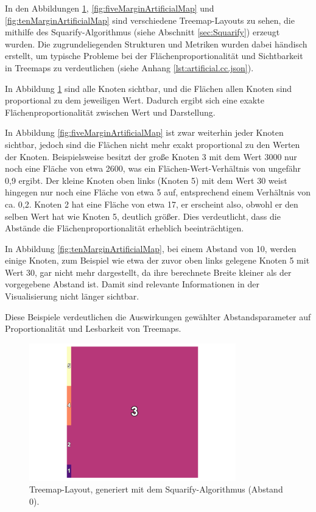 In den Abbildungen \ref{fig:zeroMarginArtificialMap}, \ref{fig:fiveMarginArtificialMap} und \ref{fig:tenMarginArtificialMap} sind verschiedene Treemap-Layouts zu sehen, die mithilfe des Squarify-Algorithmus (siehe Abschnitt \ref{sec:Squarify}) erzeugt wurden. Die zugrundeliegenden Strukturen und Metriken wurden dabei händisch erstellt, um typische Probleme bei der Flächenproportionalität und Sichtbarkeit in Treemaps zu verdeutlichen (siehe Anhang \ref{lst:artificial.cc.json}).

In Abbildung \ref{fig:zeroMarginArtificialMap} sind alle Knoten sichtbar, und die Flächen allen Knoten sind proportional zu dem jeweiligen Wert. Dadurch ergibt sich eine exakte Flächenproportionalität zwischen Wert und Darstellung.

In Abbildung \ref{fig:fiveMarginArtificialMap} ist zwar weiterhin jeder Knoten sichtbar, jedoch sind die Flächen nicht mehr exakt proportional zu den Werten der Knoten. Beispielsweise besitzt der große Knoten 3 mit dem Wert 3000 nur noch eine Fläche von etwa 2600, was ein Flächen-Wert-Verhältnis von ungefähr 0,9 ergibt. Der kleine Knoten oben links (Knoten 5) mit dem Wert 30 weist hingegen nur noch eine Fläche von etwa 5 auf, entsprechend einem Verhältnis von ca. 0,2.  Knoten 2 hat eine Fläche von etwa 17, er erscheint also, obwohl er den selben Wert hat wie Knoten 5, deutlich größer. Dies verdeutlicht, dass die Abstände die Flächenproportionalität erheblich beeinträchtigen.

In Abbildung \ref{fig:tenMarginArtificialMap}, bei einem Abstand von 10, werden einige Knoten, zum Beispiel wie etwa der zuvor oben links gelegene Knoten 5 mit Wert 30, gar nicht mehr dargestellt, da ihre berechnete Breite kleiner als der vorgegebene Abstand ist. Damit sind relevante Informationen in der Visualisierung nicht länger sichtbar.

Diese Beispiele verdeutlichen die Auswirkungen gewählter Abstandsparameter auf Proportionalität und Lesbarkeit von Treemaps.

\begin{figure}
    \centering
    \includegraphics[width=0.8\textwidth]{images/zeroMarginArtificialMap.png}
    \caption{Treemap-Layout, generiert mit dem Squarify-Algorithmus (Abstand 0).} 
    \label{fig:zeroMarginArtificialMap}
\end{figure}

